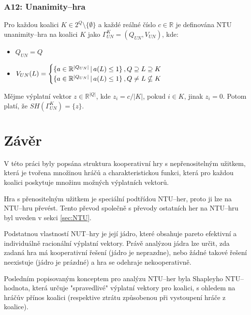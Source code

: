         \subsubsection*{A12: Unanimity--hra}
            Pro každou koalici $K \in 2^Q \setminus \{\emptyset\}$ a každé reálné číslo $c \in \mathbb{R}$ je definována NTU unanimity--hra na koalici $K$ jako $\Gamma^K_{UN} = (Q_{UN}, V_{UN})$, kde:
            \begin{itemize}
                \item $Q_{UN} = Q$
                \item $V_{UN}(L) = \begin{cases}
                    \{a \in \mathbb{R}^{|Q_{UN}|}\,|\,a(L) \leq 1\} & \hspace*{-0.8em},Q \supseteq L \supseteq K\\
                    \{a \in \mathbb{R}^{|Q_{UN}|}\,|\,a(L) \leq 1\} & \hspace*{-0.8em},Q \neq L \nsubseteq  K
                \end{cases}$
            \end{itemize}
            Mějme výplatní vektor $z \in \mathbb{R}^{|Q|}$, kde $z_i = c/|K|$, pokud $i \in K$, jinak $z_i = 0$. Potom platí, že $SH(\Gamma^K_{UN}) = \{z\}$.

\section{Závěr}
    V této práci byly popsána struktura kooperativní hry s nepřenositelným užitkem, která je tvořena množinou hráčů a charakteristickou funkci, která pro každou koalici poskytuje množinu možných výplatních vektorů.

    Hra s přenositelným užitkem je speciální podtřídou NTU--her, proto ji lze na NTU--hru převést. Tento převod společně s převody ostatních her na NTU--hru byl uveden v sekci \ref{sec:NTU}.

    Podstatnou vlastností NUT--hry je její jádro, které obsahuje pareto efektivní a individuálně racionální výplatní vektory. Právě analýzou jádra lze určit, zda zadaná hra má kooperativní řešení (jádro je neprazdne), nebo žádné takové řešení neexistuje (jádro je prázdné) a hra se odehraje nekooperativně.

    Posledním popisovaným konceptem pro analýzu NTU--her byla Shapleyho NTU--hodnota, která určuje "spravedlivé" výplatní vektory pro koalici, s ohledem na hráčův přínos koalici (respektive ztrátu způsobenou při vystoupení hráče z koalice).

